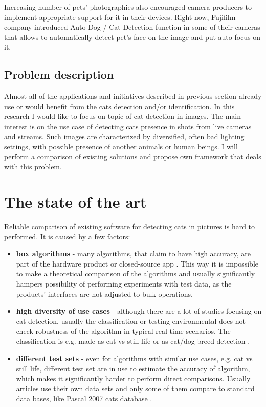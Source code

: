 \documentclass[hyperref]{acmtrans2e}
\begin{document}
Increasing number of pets' photographies also encouraged camera producers to implement appropriate support for it in their devices. Right now, Fujifilm company introduced Auto Dog / Cat Detection function \cite{FujiFilm:2009} in some of their cameras that allows to automatically detect pet's face on the image and put auto-focus on it. 
 
\subsection{Problem description}
Almost all of the applications and initiatives described in previous section already use or would benefit from the cats detection and/or identification. In this research I would like to focus on topic of cat detection in images. The main interest is on the use case of detecting cats presence in shots from live cameras and streams. Such images are characterized by  diversified, often bad lighting settings, with possible presence of another animals or human beings. I will perform a comparison of existing solutions and propose own framework that deals with this problem.

\section{The state of the art}
Reliable comparison of existing software for detecting cats in pictures is hard to performed. It is caused by a few factors:
\begin{itemize}
\item \textbf{box algorithms} - many algorithms, that claim to have high accuracy, are part of the hardware product \cite{CatFi:2015} or closed-source app \cite{PiP:2013}. This way it is impossible to make a theoretical comparison of the algorithms and usually significantly hampers possibility of performing experiments with test data, as the products' interfaces are not adjusted to bulk operations. 
\item \textbf{high diversity of use cases} - although there are a lot of studies focusing on cat detection, usually the classification or testing environmental does not check robustness of the algorithm in typical real-time scenarios. The classification is e.g. made as cat vs still life \cite{features:2007,edges:2011} or as cat/dog breed detection \cite{breed:2012}.
\item \textbf{different test sets} - even for algorithms with similar use cases, e.g. cat vs still life, different test set are in use to estimate the accuracy of algorithm, which makes it significantly harder to perform direct comparisons. Usually articles use their own data sets \cite{breed:2012,features:2007,edges:2011} and only some of them compare to standard data bases, like Pascal 2007 cats database \cite{breed:2012}. 
\end{itemize}
\end{document}

